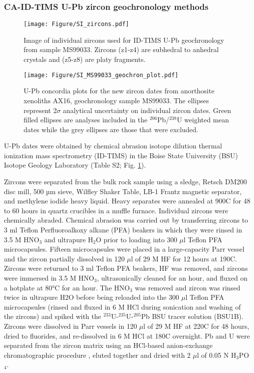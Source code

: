 \documentclass[11pt,letterpaper]{article}
\begin{document}
\subsubsection*{CA-ID-TIMS U-Pb zircon geochronology methods}

\begin{figure}[h!]
\noindent\texttt{[image: Figure/SI\_zircons.pdf]}
\centering
\caption{\footnotesize{Image of individual zircons used for ID-TIMS U-Pb geochronology from sample MS99033. Zircons (z1-z4) are subhedral to anhedral crystals and (z5-z8) are platy fragments.}}
\label{fig:zircon_image}
\end{figure}

\begin{figure}[h!]
\noindent\texttt{[image: Figure/SI\_MS99033\_geochron\_plot.pdf]}
\centering
\caption{\footnotesize{U-Pb concordia plots for the new zircon dates from anorthosite xenoliths AX16, geochronology sample MS99033. The ellipses represent 2$\sigma$ analytical uncertainty on individual zircon dates. Green filled ellipses are analyses included in the $^{206}$Pb/$^{238}$U weighted mean dates while the grey ellipses are those that were excluded. }}
\label{fig:zircon_concordia}
\end{figure}

U-Pb dates were obtained by chemical abrasion isotope dilution thermal ionization mass spectrometry (ID-TIMS) in the Boise State University (BSU) Isotope Geology Laboratory (Table S2; Fig. \ref{fig:zircon_image}). 

Zircons were separated from the bulk rock sample using a sledge, Retsch DM200 disc mill, 500 µm sieve, Wilfley Shaker Table, LB-1 Frantz magnetic separator, and methylene iodide heavy liquid. Heavy separates were annealed at 900\textdegree C for 48 to 60 hours in quartz crucibles in a muffle furnace. Individual zircons were chemically abraded. Chemical abrasion was carried out by transferring zircons to 3 ml Teflon Perfluoroalkoxy alkane (PFA) beakers in which they were rinsed in 3.5 M HNO$_\mathrm{3}$ and ultrapure H$_\mathrm{2}$O prior to loading into 300 $\mu$l Teflon PFA microcapsules. Fifteen microcapsules were placed in a large-capacity Parr vessel and the zircon partially dissolved in 120 $\mu$l of 29 M HF for 12 hours at 190\textdegree C. Zircons were returned to 3 ml Teflon PFA beakers, HF was removed, and zircons were immersed in 3.5 M HNO$_\mathrm{3}$, ultrasonically cleaned for an hour, and fluxed on a hotplate at 80°C for an hour. The HNO$_\mathrm{3}$ was removed and zircon was rinsed twice in ultrapure H2O before being reloaded into the 300 $\mu$l Teflon PFA microcapsules (rinsed and fluxed in 6 M HCl during sonication and washing of the zircons) and spiked with the $^{233}$U-$^{235}$U-$^{205}$Pb BSU tracer solution (BSU1B). Zircons were dissolved in Parr vessels in 120 $\mu$l of 29 M HF at 220\textdegree C for 48 hours, dried to fluorides, and re-dissolved in 6 M HCl at 180\textdegree C overnight. Pb and U were separated from the zircon matrix using an HCl-based anion-exchange chromatographic procedure \citep{Krogh1973a}, eluted together and dried with 2 $\mu$l of 0.05 N H$_\mathrm{3}$PO$_\mathrm{4}$.
\end{document}

